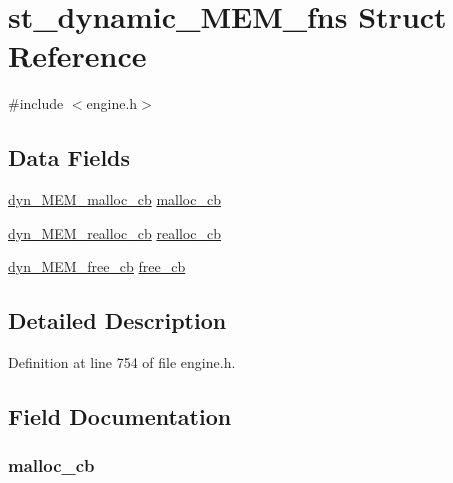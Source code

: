 \hypertarget{structst__dynamic___m_e_m__fns}{}\section{st\+\_\+dynamic\+\_\+\+M\+E\+M\+\_\+fns Struct Reference}
\label{structst__dynamic___m_e_m__fns}


{\ttfamily \#include $<$engine.\+h$>$}

\subsection*{Data Fields}
\begin{DoxyCompactItemize}
\item 
\hyperlink{include_2openssl_2engine_8h_a0f1772d9a558bc0a3f57e387bd675b10}{dyn\+\_\+\+M\+E\+M\+\_\+malloc\+\_\+cb} \hyperlink{structst__dynamic___m_e_m__fns_ac37a4e7865bf3404922a1690740f3cbf}{malloc\+\_\+cb}
\item 
\hyperlink{include_2openssl_2engine_8h_ab77176c11b1114735db82e9c6cb5c4dd}{dyn\+\_\+\+M\+E\+M\+\_\+realloc\+\_\+cb} \hyperlink{structst__dynamic___m_e_m__fns_ab4e48a8bbffa4ee179e46cbeefe9abfb}{realloc\+\_\+cb}
\item 
\hyperlink{include_2openssl_2engine_8h_abb66ea71ef8cabf36213c7abc3bef623}{dyn\+\_\+\+M\+E\+M\+\_\+free\+\_\+cb} \hyperlink{structst__dynamic___m_e_m__fns_affa5cf1a1521abe935e40029b01fd5b1}{free\+\_\+cb}
\end{DoxyCompactItemize}


\subsection{Detailed Description}


Definition at line 754 of file engine.\+h.



\subsection{Field Documentation}
\subsubsection[{\texorpdfstring{malloc\+\_\+cb}{malloc_cb}}]{ malloc\+\_\+cb}\hypertarget{structst__dynamic___m_e_m__fns_ac37a4e7865bf3404922a1690740f3cbf}{}\label{structst__dynamic___m_e_m__fns_ac37a4e7865bf3404922a1690740f3cbf}


